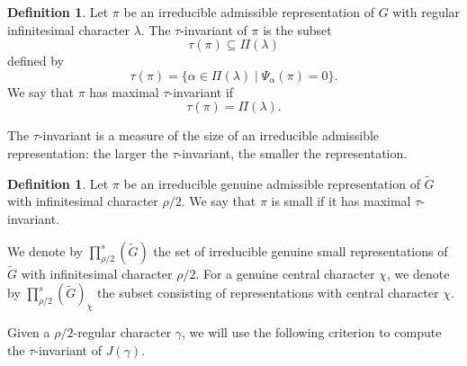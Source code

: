 \documentclass{amsart}
\theoremstyle{definition}
\newtheorem{definition}[thm]{Definition}
\begin{document}
\begin{definition}
Let $\pi$ be an irreducible admissible representation of $G$ with regular infinitesimal character $\lambda$. The $\tau$-invariant of $\pi$ is the subset
\begin{equation*}
\tau(\pi)\subseteq \Pi(\lambda)
\end{equation*}
defined by
\begin{equation*}
\tau(\pi)
=
\{\alpha\in\Pi(\lambda)\mid \Psi_\alpha(\pi)=0\}.
\end{equation*}
We say that $\pi$ has maximal $\tau$-invariant if
\begin{equation*}
\tau(\pi)=\Pi(\lambda).
\end{equation*}
\end{definition}

The $\tau$-invariant is a measure of the size of an irreducible admissible representation: the larger the $\tau$-invariant, the smaller the representation.




\begin{definition}
Let $\pi$ be an irreducible genuine admissible representation of $\widetilde G$ with infinitesimal character $\rho/2$. We say that $\pi$ is small if it has maximal $\tau$-invariant.

We denote by
$\prod\nolimits_{\rho/2}^{s}(\widetilde G)$
the set of irreducible genuine small representations of $\widetilde G$ with infinitesimal character $\rho/2$. For a genuine central character $\chi$, we denote by
$\prod\nolimits_{\rho/2}^{s}(\widetilde G)_\chi$
the subset consisting of representations with central character $\chi$.
\end{definition}


Given a $\rho/2$-regular character $\gamma$, we will use the following criterion to compute the $\tau$-invariant of $J(\gamma)$.
\end{document}
